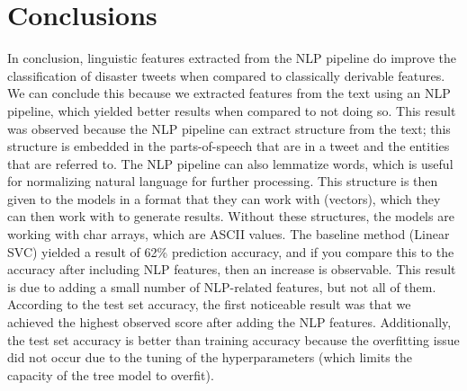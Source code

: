 \section{Conclusions}
In conclusion, linguistic features extracted from the NLP pipeline do improve the classification of disaster tweets when compared to classically derivable features.
We can conclude this because we extracted features from the text using an NLP pipeline, which yielded better results when compared to not doing so.
This result was observed because the NLP pipeline can extract structure from the text; this structure is embedded in the parts-of-speech that are in a tweet and the entities that are referred to.
 The NLP pipeline can also lemmatize words, which is useful for normalizing natural language for further processing.
This structure is then given to the models in a format that they can work with (vectors), which they can then work with to generate results.
Without these structures, the models are working with char arrays, which are ASCII values.
The baseline method (Linear SVC) yielded a result of 62\% prediction accuracy, and if you compare this to the accuracy after including NLP features, then an increase is observable.
This result is due to adding a small number of NLP-related features, but not all of them.
According to the test set accuracy, the first noticeable result was that we achieved the highest observed score after adding the NLP features.
Additionally, the test set accuracy is better than training accuracy because the overfitting issue did not occur due to the tuning of the hyperparameters (which limits the capacity of the tree model to overfit).
